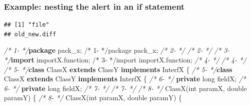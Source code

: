 \documentclass[
]{article}
\newenvironment{Shaded}{\begin{snugshade}}{\end{snugshade}}
\newcommand{\CommentTok}[1]{\textcolor[rgb]{0.56,0.35,0.01}{\textit{#1}}}
\newcommand{\DataTypeTok}[1]{\textcolor[rgb]{0.13,0.29,0.53}{#1}}
\newcommand{\FunctionTok}[1]{\textcolor[rgb]{0.00,0.00,0.00}{#1}}
\newcommand{\ImportTok}[1]{#1}
\newcommand{\KeywordTok}[1]{\textcolor[rgb]{0.13,0.29,0.53}{\textbf{#1}}}
\newcommand{\NormalTok}[1]{#1}
\begin{document}
\begin{landscape}

\subsubsection{Example: nesting the alert in an if statement} \label{example_nested_in_other_if}

\small

\begin{verbatim}
## [1] "file"
## old_new.diff
\end{verbatim}

\normalsize

\scriptsize

\begin{Shaded}
\begin{Highlighting}[]
\CommentTok{/*  1-                 */}\KeywordTok{package}\ImportTok{ pack_x;                                                /*  1-                 */package pack_x;}                                                
\CommentTok{/*  2-                 */}                                                               \CommentTok{/*  2-                 */}                                                               
\CommentTok{/*  3-                 */}\KeywordTok{import}\ImportTok{ importX.function;                                       /*  3-                 */import importX.function;}                                       
\CommentTok{/*  4-                 */}                                                               \CommentTok{/*  4-                 */}                                                               
\CommentTok{/*  5-                 */}\KeywordTok{class}\NormalTok{ ClassX }\KeywordTok{extends}\NormalTok{ ClassY }\KeywordTok{implements}\NormalTok{ InterfX \{               }\CommentTok{/*  5-                 */}\KeywordTok{class}\NormalTok{ ClassX }\KeywordTok{extends}\NormalTok{ ClassY }\KeywordTok{implements}\NormalTok{ InterfX \{               }
\CommentTok{/*  6-                 */}    \KeywordTok{private} \DataTypeTok{long}\NormalTok{ fieldX;                                       }\CommentTok{/*  6-                 */}    \KeywordTok{private} \DataTypeTok{long}\NormalTok{ fieldX;                                       }
\CommentTok{/*  7-                 */}                                                               \CommentTok{/*  7-                 */}                                                               
\CommentTok{/*  8-                 */}    \FunctionTok{ClassX}\NormalTok{(}\DataTypeTok{int}\NormalTok{ paramX, }\DataTypeTok{double}\NormalTok{ paramY) \{                                }\CommentTok{/*  8-                 */}    \FunctionTok{ClassX}\NormalTok{(}\DataTypeTok{int}\NormalTok{ paramX, }\DataTypeTok{double}\NormalTok{ paramY) \{                                }

\end{Highlighting}
\end{Shaded}
\end{landscape}
\end{document}
